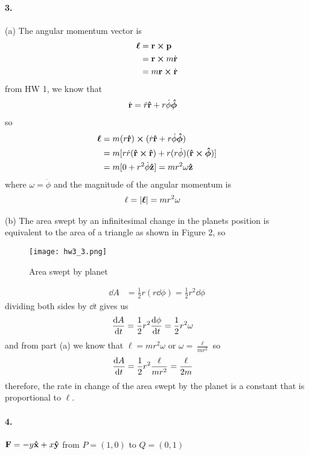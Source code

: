 \documentclass[../hw.tex]{subfiles}
\begin{document}
\paragraph*{3.} \def\sectionautorefname{3} \label{hw3_3}
(a) The angular momentum vector is
\begin{align*}
  \vb*{\ell} &= \vb{r} \cross \vb{p} \\
  &= \vb{r} \cross m \dot{\vb{r}} \\
  &= m \vb{r} \cross \dot{\vb{r}}
\end{align*}
from HW 1, we know that
\begin{align*}
  \dot{\vb{r}} &= \dot r \vu{r} + r \dot\phi \vu*{\phi}
\end{align*}
so
\begin{align*}
  \vb*{\ell} &= m (r \vu{r}) \cross (\dot r \vu{r} + r \dot\phi \vu*{\phi}) \\
  &= m [r \dot r (\vu{r} \cross \vu{r}) + r (r \dot\phi) (\vu{r} \cross \vu*{\phi})] \\
  &= m [0 + r^2 \dot\phi \vu{z}] = m r^2 \omega \vu{z}
\end{align*}
where $\omega = \dot \phi$ and the magnitude of the angular momentum is
\begin{align*}
  \ell &= \abs{\vb*{\ell}} = m r^2 \omega
\end{align*}

(b) The area swept by an infinitesimal change in the planets position is equivalent to the
area of a triangle as shown in Figure 2, so
\begin{figure*}[ht]
  \centering
  \texttt{[image: hw3\_3.png]}
  \caption{Area swept by planet}
  \label{fig:area_swept}
\end{figure*}
\begin{align*}
  \dd{A} &= \frac{1}{2} r (r \dd{\phi}) = \frac{1}{2} r^2 \dd{\phi}
\end{align*}
dividing both sides by $\dd{t}$ gives us
\begin{align*}
  \dv{A}{t} &= \frac{1}{2} r^2 \dv{\phi}{t} = \frac{1}{2} r^2 \omega
\end{align*}
and from part (a) we know that $\ell = m r^2 \omega$ or $\omega = \frac{\ell}{m r^2}$ so
\begin{align*}
  \dv{A}{t} &= \frac{1}{2} r^2 \frac{\ell}{m r^2} = \frac{\ell}{2m}
\end{align*}
therefore, the rate in change of the area swept by the planet is a constant that is proportional 
to $\ell$.

\paragraph*{4.} $\vb{F} = -y \vu{x} + x \vu{y}$ from $P = (1,0)$ to $Q = (0,1)$
\end{document}
